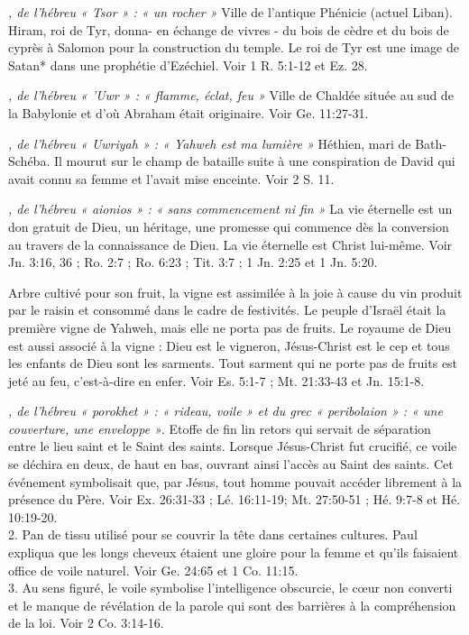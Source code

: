 \begin{multicols}{2}
\textit{, de l'hébreu « Tsor » : « un rocher »}\newline
Ville de l'antique Phénicie (actuel Liban). Hiram, roi de Tyr, donna- en échange de vivres - du bois de cèdre et du bois de cyprès à Salomon pour la construction du temple. Le roi de Tyr est une image de Satan* dans une prophétie d'Ezéchiel. Voir 1 R. 5:1-12 et Ez. 28.

\textit{, de l'hébreu « 'Uwr » : « flamme, éclat, feu »}\newline
Ville de Chaldée située au sud de la Babylonie et d'où Abraham était originaire. Voir Ge. 11:27-31.

\textit{, de l'hébreu « Uwriyah » : « Yahweh est ma lumière »}\newline
Héthien, mari de Bath-Schéba. Il mourut sur le champ de bataille suite à une conspiration de David qui avait connu sa femme et l'avait mise enceinte. Voir 2 S. 11.

\textit{, de l'hébreu « aionios » : « sans commencement ni fin »}\newline
La vie éternelle est un don gratuit de Dieu, un héritage, une promesse qui commence dès la conversion au travers de la connaissance de Dieu. La vie éternelle est Christ lui-même. Voir Jn. 3:16, 36 ; Ro. 2:7 ; Ro. 6:23 ; Tit. 3:7 ; 1 Jn. 2:25 et 1 Jn. 5:20.

\textit{}\newline
Arbre cultivé pour son fruit, la vigne est assimilée à la joie à cause du vin produit par le raisin et consommé dans le cadre de festivités. Le peuple d'Israël était la première vigne de Yahweh, mais elle ne porta pas de fruits. Le royaume de Dieu est aussi associé à la vigne : Dieu est le vigneron, Jésus-Christ est le cep et tous les enfants de Dieu sont les sarments. Tout sarment qui ne porte pas de fruits est jeté au feu, c'est-à-dire en enfer. Voir Es. 5:1-7 ; Mt. 21:33-43 et Jn. 15:1-8.

\textit{, de l'hébreu « porokhet » : « rideau, voile » et du grec « peribolaion » : « une couverture, une enveloppe »}. Etoffe de fin lin retors qui servait de séparation entre le lieu saint et le Saint des saints. Lorsque Jésus-Christ fut crucifié, ce voile se déchira en deux, de haut en bas, ouvrant ainsi l'accès au Saint des saints. Cet événement symbolisait que, par Jésus, tout homme pouvait accéder librement à la présence du Père. Voir Ex. 26:31-33 ; Lé. 16:11-19; Mt. 27:50-51 ; Hé. 9:7-8 et Hé. 10:19-20.
\\2. Pan de tissu utilisé pour se couvrir la tête dans certaines cultures. Paul expliqua que les longs cheveux étaient une gloire pour la femme et qu'ils faisaient office de voile naturel. Voir Ge. 24:65 et 1 Co. 11:15.
\\3. Au sens figuré, le voile symbolise l'intelligence obscurcie, le cœur non converti et le manque de révélation de la parole qui sont des barrières à la compréhension de la loi. Voir 2 Co. 3:14-16.


\end{multicols}

